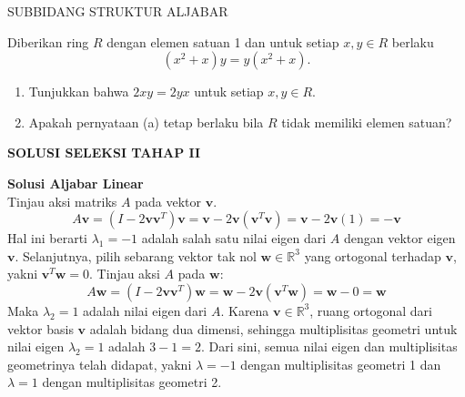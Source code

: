 \documentclass{article}
\begin{document}
\begin{center}
  SUBBIDANG STRUKTUR ALJABAR
\end{center}

Diberikan ring $R$ dengan elemen satuan 1 dan untuk setiap $x, y \in R$ berlaku
\[
  (x^2 + x)y = y(x^2 + x).
\]
\begin{enumerate}
  \item[(a)] Tunjukkan bahwa $2xy = 2yx$ untuk setiap $x, y \in R$.
  \item[(b)] Apakah pernyataan (a) tetap berlaku bila $R$ tidak memiliki elemen satuan?
\end{enumerate}

\newpage
\begin{center}
  \textbf{SOLUSI SELEKSI TAHAP II}
\end{center}

\vspace{0.5cm}

\textbf{Solusi Aljabar Linear} \\
Tinjau aksi matriks $A$ pada vektor $\mathbf{v}$.
\[
  A\mathbf{v} = (I - 2\mathbf{v}\mathbf{v}^T)\mathbf{v} = \mathbf{v} - 2\mathbf{v}(\mathbf{v}^T\mathbf{v}) = \mathbf{v} - 2\mathbf{v}(1) = -\mathbf{v}
\]
Hal ini berarti $\lambda_1 = -1$ adalah salah satu nilai eigen dari $A$ dengan vektor eigen $\mathbf{v}$.
Selanjutnya, pilih sebarang vektor tak nol $\mathbf{w} \in \mathbb{R}^3$ yang ortogonal terhadap $\mathbf{v}$, yakni $\mathbf{v}^T\mathbf{w} = 0$.
Tinjau aksi $A$ pada $\mathbf{w}$:
\[
  A\mathbf{w} = (I - 2\mathbf{v}\mathbf{v}^T)\mathbf{w} = \mathbf{w} - 2\mathbf{v}(\mathbf{v}^T\mathbf{w}) = \mathbf{w} - 0 = \mathbf{w}
\]
Maka $\lambda_2 = 1$ adalah nilai eigen dari $A$.
Karena $\mathbf{v} \in \mathbb{R}^3$, ruang ortogonal dari vektor basis $\mathbf{v}$ adalah bidang dua dimensi, sehingga multiplisitas geometri untuk nilai eigen $\lambda_2 = 1$ adalah $3-1=2$. Dari sini, semua nilai eigen dan multiplisitas geometrinya telah didapat, yakni $\lambda = -1$ dengan multiplisitas geometri 1 dan $\lambda=1$ dengan multiplisitas geometri 2.

\vspace{0.5cm}
\end{document}
